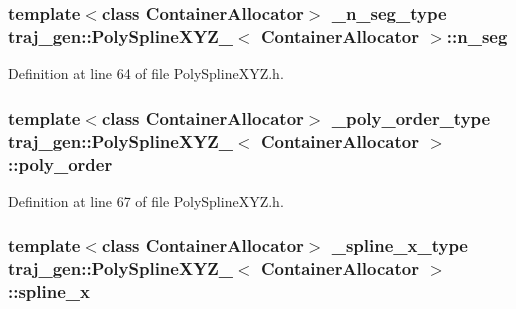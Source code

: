 \subsubsection[{\texorpdfstring{n\+\_\+seg}{n_seg}}]{\setlength{\rightskip}{0pt plus 5cm}template$<$class Container\+Allocator$>$ {\bf \+\_\+n\+\_\+seg\+\_\+type} {\bf traj\+\_\+gen\+::\+Poly\+Spline\+X\+Y\+Z\+\_\+}$<$ Container\+Allocator $>$\+::n\+\_\+seg}\hypertarget{structtraj__gen_1_1_poly_spline_x_y_z___a1315136ffc90e4164123f07aef230a6e}{}\label{structtraj__gen_1_1_poly_spline_x_y_z___a1315136ffc90e4164123f07aef230a6e}


Definition at line 64 of file Poly\+Spline\+X\+Y\+Z.\+h.

\subsubsection[{\texorpdfstring{poly\+\_\+order}{poly_order}}]{\setlength{\rightskip}{0pt plus 5cm}template$<$class Container\+Allocator$>$ {\bf \+\_\+poly\+\_\+order\+\_\+type} {\bf traj\+\_\+gen\+::\+Poly\+Spline\+X\+Y\+Z\+\_\+}$<$ Container\+Allocator $>$\+::poly\+\_\+order}\hypertarget{structtraj__gen_1_1_poly_spline_x_y_z___a868db24a21948436dd8cbe7c71241bc1}{}\label{structtraj__gen_1_1_poly_spline_x_y_z___a868db24a21948436dd8cbe7c71241bc1}


Definition at line 67 of file Poly\+Spline\+X\+Y\+Z.\+h.

\subsubsection[{\texorpdfstring{spline\+\_\+x}{spline_x}}]{\setlength{\rightskip}{0pt plus 5cm}template$<$class Container\+Allocator$>$ {\bf \+\_\+spline\+\_\+x\+\_\+type} {\bf traj\+\_\+gen\+::\+Poly\+Spline\+X\+Y\+Z\+\_\+}$<$ Container\+Allocator $>$\+::spline\+\_\+x}\hypertarget{structtraj__gen_1_1_poly_spline_x_y_z___a0e2ce289d7bb5fbcfe7e436c3c24b3a6}{}\label{structtraj__gen_1_1_poly_spline_x_y_z___a0e2ce289d7bb5fbcfe7e436c3c24b3a6}


